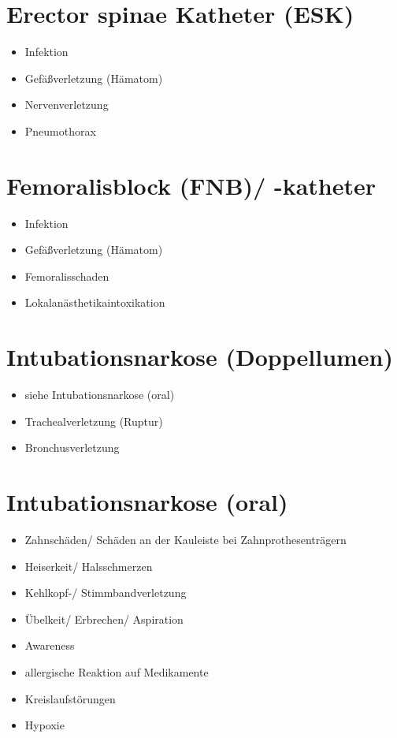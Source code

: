 \documentclass[
]{book}
\providecommand{\tightlist}{%
  \setlength{\itemsep}{0pt}\setlength{\parskip}{0pt}}
\begin{document}
\hypertarget{erector-spinae-katheter-esk}{%
\section{Erector spinae Katheter (ESK)}\label{erector-spinae-katheter-esk}}

\begin{itemize}
\tightlist
\item
  Infektion
\item
  Gefäßverletzung (Hämatom)
\item
  Nervenverletzung
\item
  Pneumothorax
\end{itemize}

\hypertarget{femoralisblock-fnb--katheter}{%
\section{Femoralisblock (FNB)/ -katheter}\label{femoralisblock-fnb--katheter}}

\begin{itemize}
\tightlist
\item
  Infektion
\item
  Gefäßverletzung (Hämatom)
\item
  Femoralisschaden
\item
  Lokalanästhetikaintoxikation
\end{itemize}

\hypertarget{intubationsnarkose-doppellumen}{%
\section{Intubationsnarkose (Doppellumen)}\label{intubationsnarkose-doppellumen}}

\begin{itemize}
\tightlist
\item
  siehe Intubationsnarkose (oral)
\item
  Trachealverletzung (Ruptur)
\item
  Bronchusverletzung
\end{itemize}

\hypertarget{intubationsnarkose-oral}{%
\section{Intubationsnarkose (oral)}\label{intubationsnarkose-oral}}

\begin{itemize}
\tightlist
\item
  Zahnschäden/ Schäden an der Kauleiste bei Zahnprothesenträgern
\item
  Heiserkeit/ Halsschmerzen
\item
  Kehlkopf-/ Stimmbandverletzung
\item
  Übelkeit/ Erbrechen/ Aspiration
\item
  Awareness
\item
  allergische Reaktion auf Medikamente
\item
  Kreislaufstörungen
\item
  Hypoxie
\end{itemize}
\end{document}
